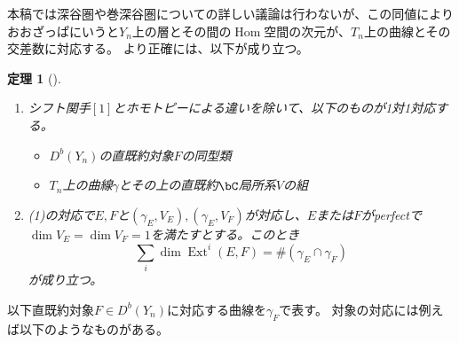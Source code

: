 \documentclass[uplatex,a4paper,dvipdfmx]{jsarticle}
\theoremstyle{plain}
\newtheorem{theorem}{定理}[section]
\theoremstyle{definition}
\DeclareMathOperator{\Hom}{\mathrm{Hom}}
\DeclareMathOperator{\Ext}{\mathrm{Ext}}
\begin{document}
本稿では深谷圏や巻深谷圏についての詳しい議論は行わないが、この同値によりおおざっぱにいうと$Y_n$上の層とその間の$\Hom$空間の次元が、$T_n$上の曲線とその交差数に対応する。
より正確には、以下が成り立つ。
\begin{theorem}[\cite{2020arXiv201108288O}]
	\begin{enumerate}
		\item シフト関手$[1]$とホモトピーによる違いを除いて、以下のものが1対1対応する。\begin{itemize}
			      \item $D^b(Y_n)$の直既約対象$F$の同型類
			      \item $T_n$上の曲線$\gamma$とその上の直既約$\bC$局所系$V$の組
		      \end{itemize}
		\item (1)の対応で$E,F$と$(\gamma_E, V_E), (\gamma_E, V_F)$が対応し、$E$または$F$がperfectで$\dim V_E = \dim V_F = 1$を満たすとする。このとき\begin{equation}
			      \sum_{i}\dim\Ext^i(E, F) = \#(\gamma_E \cap \gamma_F)
		      \end{equation}が成り立つ。
	\end{enumerate}
\end{theorem}
以下直既約対象$F \in D^b(Y_n)$に対応する曲線を$\gamma_F$で表す。
対象の対応には例えば以下のようなものがある。
\end{document}
